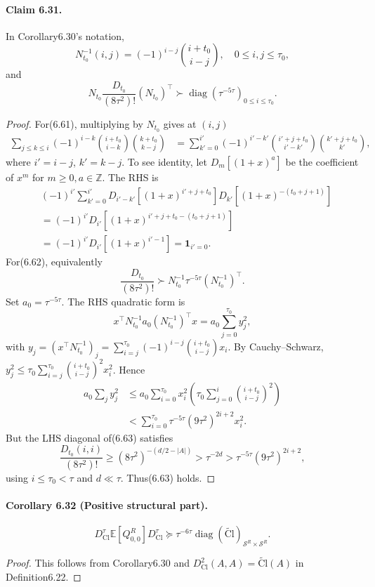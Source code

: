 \documentclass[10pt,a4paper]{article}
\begin{document}
\paragraph{Claim 6.31.} In Corollary6.30's notation,
\[N_{t_0}^{-1}(i,j)=(-1)^{i-j}\binom{i+t_0}{i-j},\quad0\le i,j\le\tau_0,\tag{6.61}\]
and
\[N_{t_0}\frac{D_{t_0}}{(8\tau^2)!}(N_{t_0})^\top\succ\operatorname{diag}(\tau^{-5\tau})_{0\le i\le\tau_0}.\tag{6.62}\]
\begin{proof}For(6.61), multiplying by $N_{t_0}$ gives at $(i,j)$
\begin{align*}\sum_{j\le k\le i}(-1)^{i-k}\binom{i+t_0}{i-k}\binom{k+t_0}{k-j}&=\sum_{k'=0}^{i'}(-1)^{i'-k'}\binom{i'+j+t_0}{i'-k'}\binom{k'+j+t_0}{k'},\end{align*}
where $i'=i-j$, $k'=k-j$. To see identity, let $D_m[(1+x)^a]$ be the coefficient of $x^m$ for $m\ge0,a\in\mathbb Z$. The RHS is
\begin{align*}&(-1)^{i'}\sum_{k'=0}^{i'}D_{i'-k'}[(1+x)^{i'+j+t_0}]D_{k'}[(1+x)^{-(t_0+j+1)}]\\&=(-1)^{i'}D_{i'}[(1+x)^{i'+j+t_0-(t_0+j+1)}]\\&=(-1)^{i'}D_{i'}[(1+x)^{i'-1}]=\mathbf1_{i'=0}.
\end{align*}
For(6.62), equivalently
\[\frac{D_{t_0}}{(8\tau^2)!}\succ N_{t_0}^{-1}\tau^{-5\tau}(N_{t_0}^{-1})^\top.\tag{6.63}\]
Set $a_0=\tau^{-5\tau}$. The RHS quadratic form is
\[x^\top N_{t_0}^{-1}a_0(N_{t_0}^{-1})^\top x=a_0\sum_{j=0}^{\tau_0}y_j^2,\tag{6.64}\]
with $y_j=(x^\top N_{t_0}^{-1})_j=\sum_{i=j}^{\tau_0}(-1)^{i-j}\binom{i+t_0}{i-j}x_i$. By Cauchy--Schwarz, $y_j^2\le\tau_0\sum_{i=j}^{\tau_0}\binom{i+t_0}{i-j}^2x_i^2$. Hence
\begin{align*}a_0\sum_jy_j^2&\le a_0\sum_{i=0}^{\tau_0}x_i^2\left(\tau_0\sum_{j=0}^i\binom{i+t_0}{i-j}^2\right)\\&<\sum_{i=0}^{\tau_0}\tau^{-5\tau}(9\tau^2)^{2i+2}x_i^2.\end{align*}
But the LHS diagonal of(6.63) satisfies
\[\frac{D_{t_0}(i,i)}{(8\tau^2)!}\ge(8\tau^2)^{-(d/2-|A|)}>\tau^{-2d}>\tau^{-5\tau}(9\tau^2)^{2i+2},\]
using $i\le\tau_0<\tau$ and $d\ll\tau$. Thus(6.63) holds.\end{proof}
\paragraph{Corollary 6.32 (Positive structural part).}
\[D_{\mathrm{Cl}}^\tau\mathbb E[Q_{0,0}^R]D_{\mathrm{Cl}}^\tau\succeq\tau^{-6\tau}\operatorname{diag}(\widetilde{\mathrm{Cl}})_{\mathcal S^R\times\mathcal S^R}.\]
\begin{proof}This follows from Corollary6.30 and $D_{\mathrm{Cl}}^2(A,A)=\widetilde{\mathrm{Cl}}(A)$ in Definition6.22.\end{proof}
\end{document}

